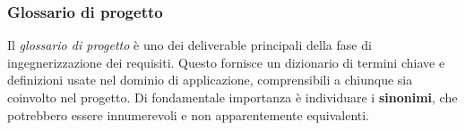 \documentclass[a4paper,11pt]{article}
\begin{document}
\subsubsection{Glossario di progetto}
Il \textit{glossario di progetto} è uno dei deliverable principali della fase di ingegnerizzazione dei requisiti.
Questo fornisce un dizionario di termini chiave e definizioni usate nel dominio di applicazione, comprensibili a chiunque sia coinvolto nel progetto.
Di fondamentale importanza è individuare i \textbf{sinonimi}, che potrebbero essere innumerevoli e non apparentemente equivalenti.
\end{document}
